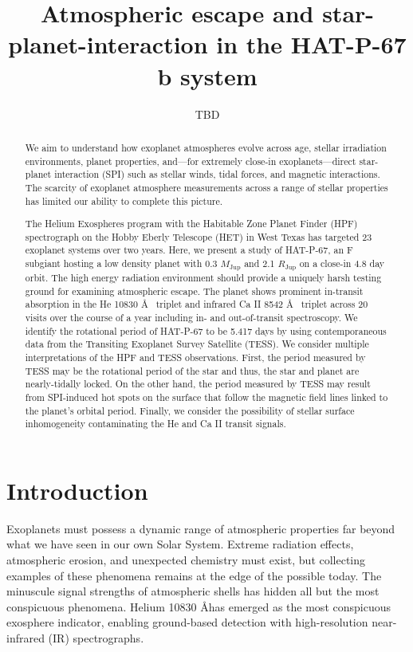 \documentclass[modern]{aastex631}
\begin{document}

\title{Atmospheric escape and star-planet-interaction in the HAT-P-67 b system}

\author{TBD}


\begin{abstract}
    We aim to understand how exoplanet atmospheres evolve across age, stellar irradiation environments, planet properties, and---for extremely close-in exoplanets---direct star-planet interaction (SPI) such as stellar winds, tidal forces, and magnetic interactions. The scarcity of exoplanet atmosphere measurements across a range of stellar properties has limited our ability to complete this picture.

    The Helium Exospheres program with the Habitable Zone Planet Finder (HPF) spectrograph on the Hobby Eberly Telescope (HET) in West Texas has targeted 23 exoplanet systems over two years. Here, we present a study of HAT-P-67, an F subgiant hosting a low density planet with 0.3 $M_{\mathrm{Jup}}$ and 2.1 $R_{\mathrm{Jup}}$ on a close-in 4.8 day orbit. The high energy radiation environment should provide a uniquely harsh testing ground for examining atmospheric escape. The planet shows prominent in-transit absorption in the He 10830 \AA~ triplet and infrared Ca II 8542 \AA~ triplet across 20 visits over the course of a year including in- and out-of-transit spectroscopy. We identify the rotational period of HAT-P-67 to be 5.417 days by using contemporaneous data from the Transiting Exoplanet Survey Satellite (TESS). We consider multiple interpretations of the HPF and TESS observations. First, the period measured by TESS may be the rotational period of the star and thus, the star and planet are nearly-tidally locked. On the other hand, the period measured by TESS may result from SPI-induced hot spots on the surface that follow the magnetic field lines linked to the planet's orbital period. Finally, we consider the possibility of stellar surface inhomogeneity contaminating the He and Ca II transit signals.
\end{abstract}


\section{Introduction}\label{sec:intro}

Exoplanets must possess a dynamic range of atmospheric properties far beyond what we have seen in our own Solar System.  Extreme radiation effects, atmospheric erosion, and unexpected chemistry must exist, but collecting examples of these phenomena remains at the edge of the possible today. The minuscule signal strengths of atmospheric shells has hidden all but the most conspicuous phenomena.  Helium 10830 \AA has emerged as the most conspicuous exosphere indicator, enabling ground-based detection with high-resolution near-infrared (IR) spectrographs.
\end{document}
